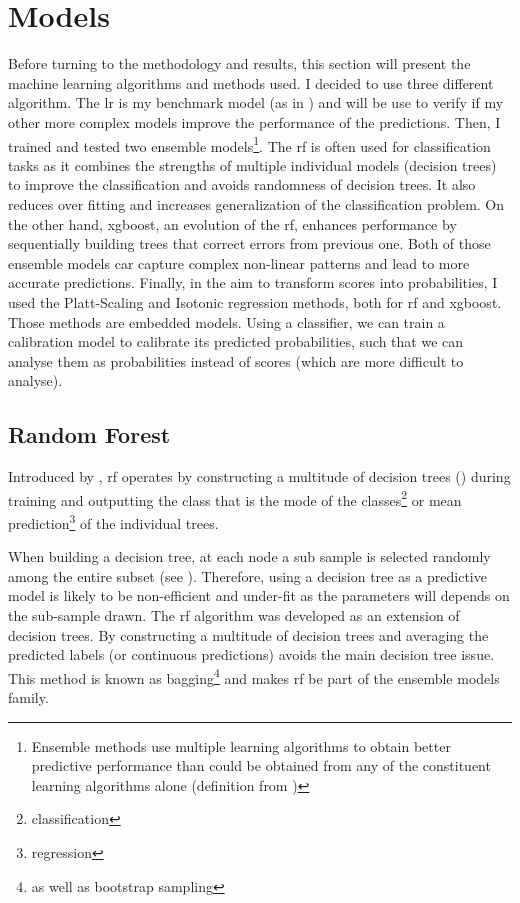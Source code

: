 \documentclass[12pt]{article}
\begin{document}
\newpage
\section{Models}
Before turning to the methodology and results, this section will present the machine learning algorithms and methods used.\hfill \break
\indent I decided to use three different algorithm.
The \acrlong{lr} is my benchmark model (as in \cite{MishandledBgas}) and will be use to verify if my other more complex models improve the performance of the predictions. 
Then, I trained and tested two ensemble models\footnote{Ensemble methods use multiple learning algorithms to obtain better predictive performance than could be obtained from any of the constituent learning algorithms alone (definition from \cite{wikiensemble})}. The \acrfull{rf} is often used for classification tasks as it combines the strengths of multiple individual models (decision trees) to improve the classification and avoids randomness of decision trees. It also reduces over fitting and increases generalization of the classification problem.
On the other hand, \acrfull{xgboost}, an evolution of the \acrshort{rf}, enhances performance by sequentially building trees that correct errors from previous one.
Both of those ensemble models car capture complex non-linear patterns and lead to more accurate predictions.
Finally, in the aim to transform scores into probabilities, I used the Platt-Scaling and Isotonic regression methods, both for \acrshort{rf} and \acrshort{xgboost}. Those methods are embedded models. Using a classifier, we can train a calibration model to calibrate its predicted probabilities, such that we can analyse them as probabilities instead of scores (which are more difficult to analyse).


\subsection{Random Forest}\label{subsec:Random forest}
 
Introduced by \cite{Breiman2001}, \acrlong{rf} operates by constructing a multitude of decision trees (\cite{DecisionTrees}) during training and outputting the class that is the mode of the classes\footnote{classification} or mean prediction\footnote{regression} of the individual trees. 

When building a decision tree, at each node a sub sample is selected randomly among the entire subset (see \cite{LouppeRF}). Therefore, using a decision tree as a predictive model is likely to be non-efficient and under-fit as the parameters will depends on the sub-sample drawn. The \acrshort{rf} algorithm was developed as an extension of decision trees. By constructing a multitude of decision trees and averaging the predicted labels (or continuous predictions) avoids the main decision tree issue. This method is known as bagging\footnote{as well as bootstrap sampling} and makes \acrshort{rf} be part of the ensemble models family.\hfill \break
\end{document}
